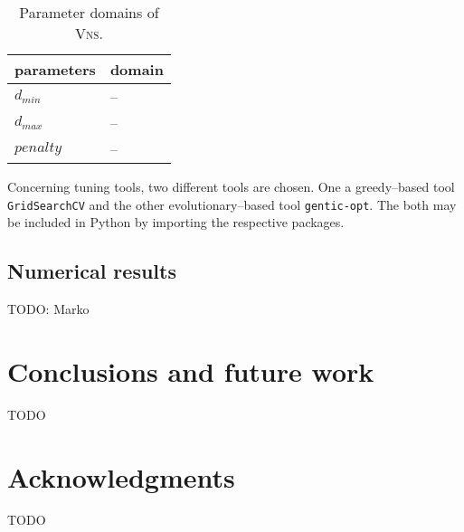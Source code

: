 \documentclass[sigconf]{acmart}
\begin{document}
    \begin{table}[ht]
   	\begin{tabular}{ll}
   		parameters      & domain \\ \hline
   	$d_{min}$ &  -- \\
   	$d_{max}$ &  -- \\
   	 $penalty$ & --  \\   \hline
   	\end{tabular}
   	\caption{Parameter domains of \textsc{Vns}.}  
   	   	\label{tab:domain_tuning}
   \end{table}
   
   Concerning tuning tools, two different tools are chosen. One a greedy--based tool \texttt{GridSearchCV} and the other evolutionary--based tool \texttt{gentic-opt}. The both may be included in Python by importing the respective packages.
   
    
\subsection{Numerical results }
 TODO: Marko
\section{Conclusions and future work}
 TODO
 
\section*{Acknowledgments} 
TODO



 
\end{document}
